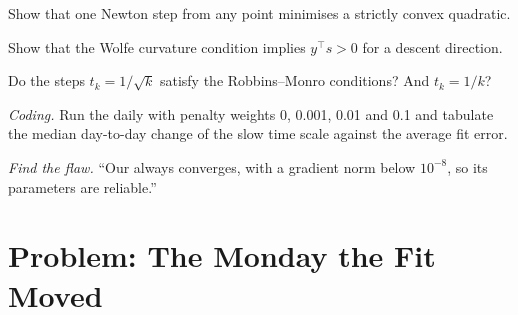 \begin{exercise}[$\star\star$]\label{exo:qm:numerical-optimisation-in-practice:4}
Show that one Newton step from any point minimises a strictly convex quadratic.
\end{exercise}

\begin{exercise}[$\star\star$]\label{exo:qm:numerical-optimisation-in-practice:5}
Show that the Wolfe curvature condition implies $y^\top s > 0$ for a descent direction.
\end{exercise}

\begin{exercise}[$\star\star$]\label{exo:qm:numerical-optimisation-in-practice:6}
Do the steps $t_k = 1/\sqrt k$ satisfy the Robbins--Monro conditions? And $t_k = 1/k$?
\end{exercise}

\begin{exercise}[$\star\star\star$]\label{exo:qm:numerical-optimisation-in-practice:7}
\emph{Coding.} Run the daily  with penalty weights 0, 0.001, 0.01 and 0.1 and tabulate the median day-to-day change of the slow time scale against the average fit error.
\end{exercise}

\begin{exercise}[$\star\star\star$]\label{exo:qm:numerical-optimisation-in-practice:8}
\emph{Find the flaw.} ``Our  always converges, with a gradient norm below $10^{-8}$, so its parameters are reliable.''
\end{exercise}

\section{Problem: The Monday the Fit Moved}

